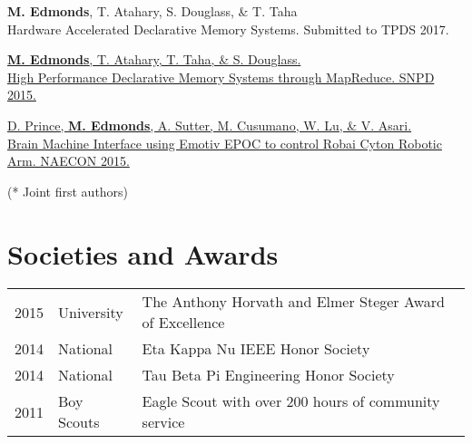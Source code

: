 \documentclass[letterpaper]{deedy-resume} %
\begin{document}
\begin{minipage}[t]{0.66\textwidth}
\vspace{5pt}

{\bf M. Edmonds}, T. Atahary, S. Douglass, \& T. Taha\\
Hardware Accelerated Declarative Memory Systems. Submitted to TPDS 2017.

\vspace{5pt}

\href{http://ieeexplore.ieee.org/xpl/articleDetails.jsp?arnumber=7176183}
{{\bf M. Edmonds}, T. Atahary, T. Taha, \& S. Douglass. \\
High Performance Declarative Memory Systems through MapReduce. SNPD 2015.}

\vspace{5pt}

\href{http://ecommons.udayton.edu/cgi/viewcontent.cgi?article=1388&context=ece_fac_pub}
{D. Prince, {\bf M. Edmonds}, A. Sutter, M. Cusumano, W. Lu, \& V. Asari.\\
Brain Machine Interface using Emotiv EPOC to control Robai Cyton Robotic Arm. NAECON 2015.}


\hfill {\footnotesize (* Joint first authors)}

\sectionspace %


\section{Societies and Awards} 

\begin{tabular}{rll}
2015 & University & The Anthony Horvath and Elmer Steger Award of Excellence \\
2014 & National & Eta Kappa Nu IEEE Honor Society\\
2014 & National & Tau Beta Pi Engineering Honor Society\\
2011 & Boy Scouts & Eagle Scout with over 200 hours of community service\\
\end{tabular}

\sectionspace %


\end{minipage} %
\end{document}

